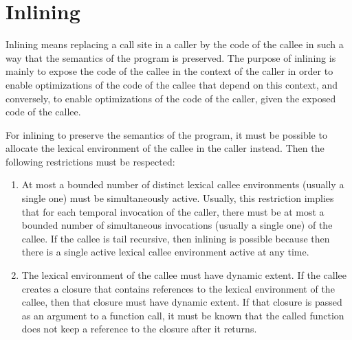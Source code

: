 \chapter{Inlining}

Inlining means replacing a call site in a caller by the code of the
callee in such a way that the semantics of the program is preserved.
The purpose of inlining is mainly to expose the code of the callee in
the context of the caller in order to enable optimizations of the code
of the callee that depend on this context, and conversely, to enable
optimizations of the code of the caller, given the exposed code of the
callee.

For inlining to preserve the semantics of the program, it must be
possible to allocate the lexical environment of the callee in the
caller instead.  Then the following restrictions must be respected:

\begin{enumerate}
\item At most a bounded number of distinct lexical callee environments
  (usually a single one) must be simultaneously active.  Usually, this
  restriction implies that for each temporal invocation of the caller,
  there must be at most a bounded number of simultaneous invocations
  (usually a single one) of the callee.  If the callee is tail
  recursive, then inlining is possible because then there is a single
  active lexical callee environment active at any time.
\item The lexical environment of the callee must have dynamic extent.
  If the callee creates a closure that contains references to the
  lexical environment of the callee, then that closure must have
  dynamic extent.  If that closure is passed as an argument to a
  function call, it must be known that the called function does not
  keep a reference to the closure after it returns.
\end{enumerate}
